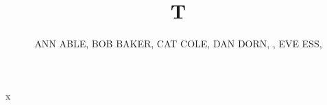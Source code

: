 \documentclass[journal]{IEEEtran}
\begin{document}
\title{T}
\author{\uppercase{Ann Able},
\uppercase{Bob Baker, Cat Cole, 
Dan Dorn, , Eve Ess,}
}
\maketitle
x
\end{document}
